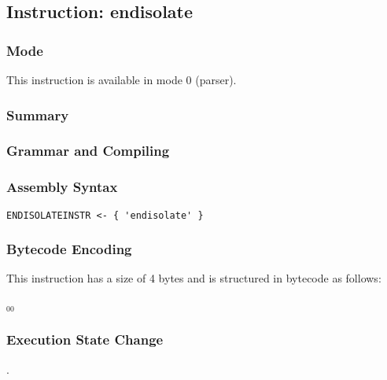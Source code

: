 \subsection{Instruction: endisolate}

\subsubsection{Mode}
This instruction is available in mode 0 (parser).
\subsubsection{Summary}


\subsubsection{Grammar and Compiling}


\subsubsection{Assembly Syntax}

\begin{myquote}
\begin{verbatim}
ENDISOLATEINSTR <- { 'endisolate' }
\end{verbatim}
\end{myquote}

\subsubsection{Bytecode Encoding}

This instruction has a size of 4 bytes and is structured in bytecode as follows:

$_{00}$\ 


\subsubsection{Execution State Change}

.


